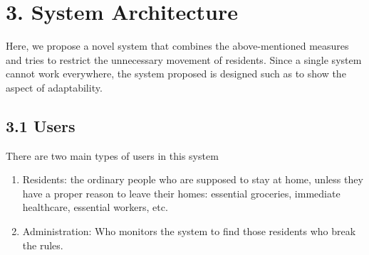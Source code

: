 \documentclass[eng]{FCEFyN-class}
\begin{document}
\section{3. System Architecture}

Here, we propose a novel system that combines the above-mentioned measures and tries to restrict the unnecessary movement of residents. Since a single system cannot work everywhere, the system proposed
is designed such as to show the aspect of adaptability.

\subsection{3.1 Users}
There are two main types of users in this system
\begin{enumerate}
\item Residents: the ordinary people who are supposed to stay at home, unless they have a proper reason to leave their homes: essential groceries, immediate healthcare, essential workers, etc.

\item Administration: Who monitors the system to find those residents who break the rules.
\end{enumerate}
\end{document}
